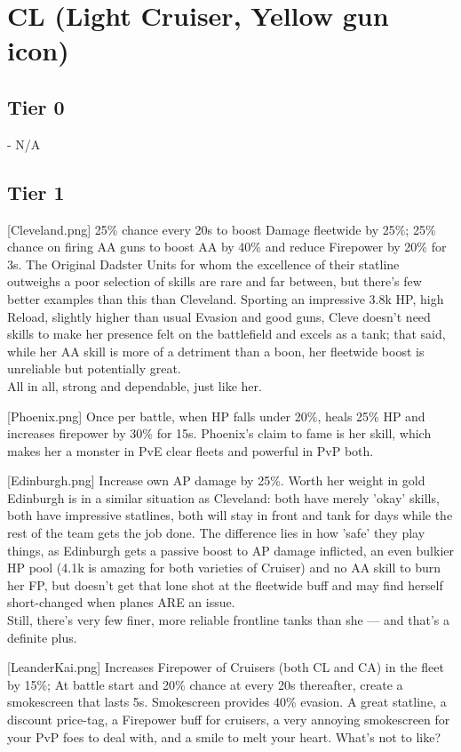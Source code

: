 \newpage
\section[CL]{CL (Light Cruiser, Yellow gun icon)}
\subsection{Tier 0}
- N/A
 
 
\newpage
\subsection{Tier 1}
[Cleveland.png]
{25\% chance every 20s to boost Damage fleetwide by 25\%; 25\% chance on firing AA guns to boost AA by 40\% and reduce Firepower by 20\% for 3s.}
{The Original Dadster}
{Units for whom the excellence of their statline outweighs a poor selection of skills are rare and far between, but there's few better examples than this than Cleveland. Sporting an impressive 3.8k HP, high Reload, slightly higher than usual Evasion and good guns, Cleve doesn't need skills to make her presence felt on the battlefield and excels as a tank; that said, while her AA skill is more of a detriment than a boon, her fleetwide boost is unreliable but potentially great.\\
All in all, strong and dependable, just like her.}

[Phoenix.png]
{Once per battle, when HP falls under 20\%, heals 25\% HP and increases firepower by 30\% for 15s.}
{}
{Phoenix's claim to fame is her skill, which makes her a monster in PvE clear fleets and powerful in PvP both.}

[Edinburgh.png]
{Increase own AP damage by 25\%.}
{Worth her weight in gold}
{Edinburgh is in a similar situation as Cleveland: both have merely 'okay' skills, both have impressive statlines, both will stay in front and tank for days while the rest of the team gets the job done. The difference lies in how 'safe' they play things, as Edinburgh gets a passive boost to AP damage inflicted, an even bulkier HP pool (4.1k is amazing for both varieties of Cruiser) and no AA skill to burn her FP, but doesn't get that lone shot at the fleetwide buff and may find herself short-changed when planes ARE an issue.\\
Still, there's very few finer, more reliable frontline tanks than she --- and that's a definite plus.}

[LeanderKai.png]
{Increases Firepower of Cruisers (both CL and CA) in the fleet by 15\%; At battle start and 20\% chance at every 20s thereafter, create a smokescreen that lasts 5s. Smokescreen provides 40\% evasion.}
{}
{A great statline, a discount price-tag, a Firepower buff for cruisers, a very annoying smokescreen for your PvP foes to deal with, and a smile to melt your heart. What's not to like?}

